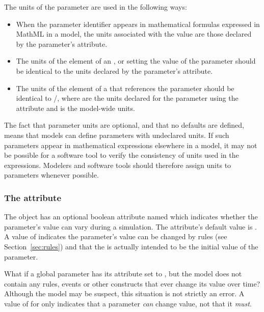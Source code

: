 The units of the parameter are used in the following ways:
\begin{itemize}

\item When the parameter identifier appears in mathematical
  formulas expressed in MathML in a model, the units associated
  with the value are those declared by the parameter's
   attribute.

\item The units of the  element of an \AssignmentRule,
  \InitialAssignment or \EventAssignment setting the value of the
  parameter should be identical to the units declared by the
  parameter's  attribute.

\item The units of the  element of a \RateRule that
  references the parameter should be identical to /, where  are
  the units declared for the parameter using the 
  attribute and  is the model-wide 
  units.

\end{itemize}
\vspace*{-1ex}

The fact that parameter units are optional, and that no defaults
are defined, means that models can define parameters with
undeclared units.  If such parameters appear in mathematical
expressions elsewhere in a model, it may not be possible for a
software tool to verify the consistency of units used in the
expressions.  Modelers and software tools should therefore assign
units to parameters whenever possible.


\subsubsection{The  attribute}
\label{sec:parameter-constant}

The \Parameter object has an optional boolean attribute named
 which indicates whether the parameter's value can
vary during a simulation.  The attribute's default value is
.  A value of  indicates the parameter's
value can be changed by rules (see Section~\ref{sec:rules}) and
that the  is actually intended to be the initial
value of the parameter.

What if a global parameter has its  attribute set to
, but the model does not contain any rules, events or
other constructs that ever change its value over time?  Although
the model may be suspect, this situation is not strictly an error.
A value of  for  only indicates that a
parameter \emph{can} change value, not that it \emph{must}.


